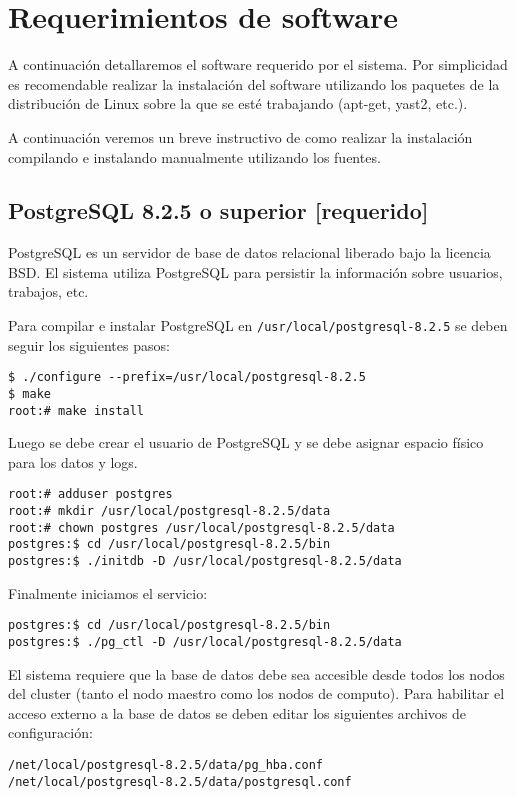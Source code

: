 \documentclass[a4paper,10pt,spanish]{article}
\begin{document}
\section{Requerimientos de software}

A continuaci\'{o}n detallaremos el software requerido por el sistema. Por simplicidad es recomendable realizar la instalaci\'{o}n del software utilizando los paquetes de la distribuci\'{o}n de Linux sobre la que se est\'{e} trabajando (apt-get, yast2, etc.).

A continuaci\'{o}n veremos un breve instructivo de como realizar la instalaci\'{o}n compilando e instalando manualmente utilizando los fuentes.

\subsection{PostgreSQL 8.2.5 o superior \small{[requerido]}}

PostgreSQL\cite{postgres} es un servidor de base de datos relacional liberado bajo la licencia BSD. El sistema utiliza PostgreSQL para persistir la informaci\'{o}n sobre usuarios, trabajos, etc.

Para compilar e instalar PostgreSQL en \mbox{\texttt{/usr/local/postgresql-8.2.5}} se deben seguir los siguientes pasos:

\begin{verbatim}
$ ./configure --prefix=/usr/local/postgresql-8.2.5
$ make
root:# make install
\end{verbatim}

Luego se debe crear el usuario de PostgreSQL y se debe asignar espacio f\'{i}sico para los datos y logs.

\begin{verbatim}
root:# adduser postgres 
root:# mkdir /usr/local/postgresql-8.2.5/data 
root:# chown postgres /usr/local/postgresql-8.2.5/data 
postgres:$ cd /usr/local/postgresql-8.2.5/bin
postgres:$ ./initdb -D /usr/local/postgresql-8.2.5/data 
\end{verbatim}

Finalmente iniciamos el servicio:

\begin{verbatim}
postgres:$ cd /usr/local/postgresql-8.2.5/bin
postgres:$ ./pg_ctl -D /usr/local/postgresql-8.2.5/data
\end{verbatim}

El sistema requiere que la base de datos debe sea accesible desde todos los nodos del cluster (tanto el nodo maestro como los nodos de computo). Para habilitar el acceso externo a la base de datos se deben editar los siguientes archivos de configuraci\'{o}n:
\begin{verbatim}
/net/local/postgresql-8.2.5/data/pg_hba.conf
/net/local/postgresql-8.2.5/data/postgresql.conf
\end{verbatim}
\end{document}

